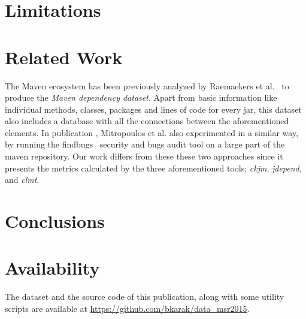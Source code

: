 \documentclass{sig-alternate}
\begin{document}
\section{Limitations}
\label{sec:limit}

\section{Related Work}
\label{sec:rel}

The Maven ecosystem has been previously analyzed by Raemaekers et al.~\cite{RDV13} to produce the {\it Maven dependency dataset}. Apart from basic information like individual methods, classes, packages and lines of code for every {\sc jar}, this dataset also includes a database with all the connections between the aforementioned elements. In publication \cite{MKLGS14}, Mitropoulos et al. also experimented in a similar way, by running the findbugs~\cite{HP04} security and bugs audit tool on a large part of the maven repository. Our work differs from these these two approaches since it presents the metrics calculated by the three aforementioned tools; \textit{ckjm}, \textit{jdepend}, and \textit{clmt}.

\section{Conclusions}
\label{sec:conc}

\section{Availability}

The dataset and the source code of this publication, along with some utility scripts are available at \url{https://github.com/bkarak/data_msr2015}.



\end{document}
